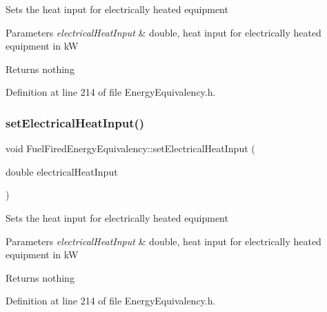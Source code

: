 Sets the heat input for electrically heated equipment


\begin{DoxyParams}{Parameters}
{\em electrical\+Heat\+Input} & double, heat input for electrically heated equipment in kW\\
\hline
\end{DoxyParams}
\begin{DoxyReturn}{Returns}
nothing 
\end{DoxyReturn}


Definition at line 214 of file Energy\+Equivalency.\+h.

\mbox{\label{class_fuel_fired_energy_equivalency_a222836bfef1cb0caec0adafc2ef6b7ea}} 
\subsubsection{\texorpdfstring{set\+Electrical\+Heat\+Input()}{setElectricalHeatInput()}\hspace{0.1cm}{\footnotesize\ttfamily [2/3]}}
{\footnotesize\ttfamily void Fuel\+Fired\+Energy\+Equivalency\+::set\+Electrical\+Heat\+Input (\begin{DoxyParamCaption}\item[{double}]{electrical\+Heat\+Input }\end{DoxyParamCaption})\hspace{0.3cm}{\ttfamily [inline]}}

Sets the heat input for electrically heated equipment


\begin{DoxyParams}{Parameters}
{\em electrical\+Heat\+Input} & double, heat input for electrically heated equipment in kW\\
\hline
\end{DoxyParams}
\begin{DoxyReturn}{Returns}
nothing 
\end{DoxyReturn}


Definition at line 214 of file Energy\+Equivalency.\+h.

\mbox{\label{class_fuel_fired_energy_equivalency_a222836bfef1cb0caec0adafc2ef6b7ea}} 
